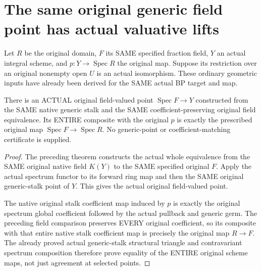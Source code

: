 \section{The same original generic field point has actual valuative lifts}
\label{sec:generic-open-valuative-lift}

Let $R$ be the original domain, $F$ its SAME specified fraction field,
$Y$ an actual integral scheme, and $p:Y\to\operatorname{Spec}R$
the original map. Suppose its restriction over an original nonempty
open $U$ is an actual isomorphism. These ordinary geometric inputs
have already been derived for the SAME actual BP target and map.

\begin{theorem}
\label{sc0-generic-valuative:original-generic-point}
\leanok
There is an ACTUAL original field-valued point
$\operatorname{Spec}F\to Y$ constructed from the SAME native
generic stalk and the SAME coefficient-preserving original field
equivalence. Its ENTIRE composite with the original $p$ is exactly
the prescribed original map
$\operatorname{Spec}F\to\operatorname{Spec}R$.
No generic-point or coefficient-matching certificate is supplied.
\end{theorem}
\begin{proof}
The preceding theorem constructs the actual whole equivalence from
the SAME original native field $K(Y)$ to the SAME specified original
$F$. Apply the actual spectrum functor to its forward ring map and
then the SAME original generic-stalk point of $Y$. This gives the
actual original field-valued point.

The native original stalk coefficient map induced by $p$ is exactly
the original spectrum global coefficient followed by the actual
pullback and generic germ. The preceding field comparison preserves
EVERY original coefficient, so its composite with that entire native
stalk coefficient map is precisely the original map $R\to F$.
The already proved actual generic-stalk structural triangle and
contravariant spectrum composition therefore prove equality of the
ENTIRE original scheme maps, not just agreement at selected points.
\end{proof}

